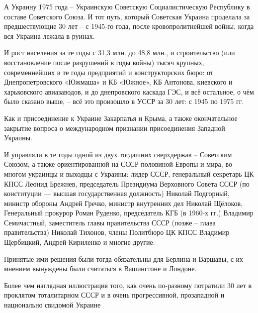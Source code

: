 А Украину 1975 года – Украинскую Советскую Социалистическую Республику в
составе Советского Союза. И тот путь, который Советская Украина проделала за
предшествующие 30 лет – с 1945-го года, после кровопролитнейшей войны, когда
вся Украина лежала в руинах. 

И рост населения за те годы с 31,3 млн. до 48,8 млн., и строительство (или
восстановление после разрушений в годы войны) тысяч крупных, современнейших в
те годы предприятий и конструкторских бюро: от Днепропетровского «Южмаша» и КБ
«Южное», КБ Антонова, киевского и харьковского авиазаводов, и до днепровского
каскада ГЭС, и всё остальное, о чём было сказано выше, – всё это произошло в
УССР за 30 лет: с 1945 по 1975 гг. 

Как и присоединение к Украине Закарпатья и Крыма, а также окончательное
закрытие вопроса о международном признании присоединения Западной Украины.

И управляли в те годы одной из двух тогдашних сверхдержав – Советским Союзом, а
также ориентированной на СССР половиной Европы и мира, во многом украинцы и
выходцы с Украины: лидер СССР, генеральный секретарь ЦК КПСС Леонид Брежнев,
председатель Президиума Верховного Совета СССР (по конституции — высшая
государственная должность) Николай Подгорный, министр обороны Андрей Гречко,
министр внутренних дел Николай Щёлоков, Генеральный прокурор Роман Руденко,
председатель КГБ (в 1960-х гг.)  Владимир Семичастный, заместитель главы
правительства СССР (позже – глава правительства) Николай Тихонов, члены
Политбюро ЦК КПСС Владимир Щербицкий, Андрей Кириленко и многие другие.

Принятые ими решения были тогда обязательны для Берлина и Варшавы, с их мнением
вынуждены были считаться в Вашингтоне и Лондоне.

Более чем наглядная иллюстрация того, как очень по-разному потратили 30 лет в
проклятом тоталитарном СССР и в очень прогрессивной, прозападной и национально
свидомой Украине

